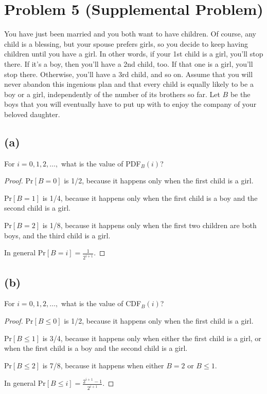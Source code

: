 \documentclass[14pt]{extarticle}
\newcommand{\dps}{\displaystyle}
\begin{document}
\section{Problem 5 (Supplemental Problem)}
You have just been married and you both want to have children. Of course, any child is a blessing, but your spouse prefers girls, so you decide to keep having children until you have a girl. In other words, if your 1st child is a girl, you’ll stop there. If it’s a boy, then you’ll have a 2nd child, too. If that one is a girl, you’ll stop there. Otherwise, you’ll have a 3rd child, and so on. Assume that you will never abandon this ingenious plan and that every child is equally likely to be a boy or a girl, independently of the number of its brothers so far. Let $B$ be the boys that you will eventually have to put up with to enjoy the company of your beloved daughter.

\subsection{(a)}
For $i = 0, 1, 2, \ldots,$ what is the value of PDF$_B(i)$?

\begin{proof}
Pr$[B = 0]$ is 1/2, because it happens only when the first child is a girl.

Pr$[B = 1]$ is 1/4, because it happens only when the first child is a boy and the second child is a girl.

Pr$[B = 2]$ is 1/8, because it happens only when the first two children are both boys, and the third child is a girl.

In general Pr$[B = i] = \dps\frac{1}{2^{i+1}}$.
\end{proof}

\subsection{(b)}
For $i = 0, 1, 2, \ldots,$ what is the value of CDF$_B(i)$?

\begin{proof}
Pr$[B \leq 0]$ is 1/2, because it happens only when the first child is a girl.

Pr$[B \leq 1]$ is 3/4, because it happens only when either the first child is a girl, or when the first child is a boy and the second child is a girl.

Pr$[B \leq 2]$ is 7/8, because it happens when either $B = 2$ or $B \leq 1$.

In general Pr$[B \leq i] = \dps\frac{2^{i+1} - 1}{2^{i+1}}$.
\end{proof}
\end{document}
